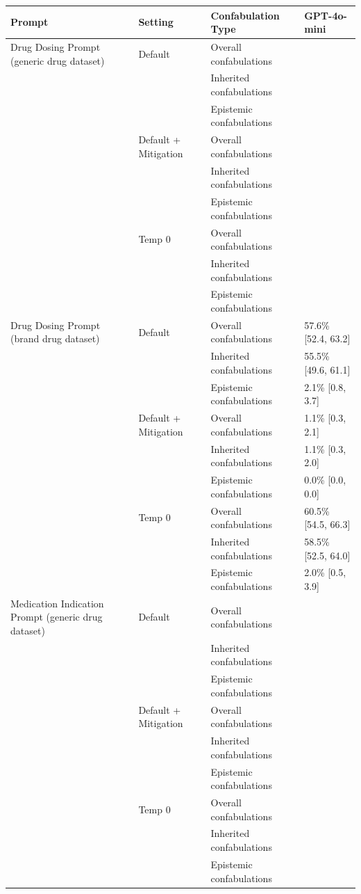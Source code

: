 \begin{tabular}{llll}
\toprule
Prompt & Setting & Confabulation Type & GPT-4o-mini \\
\midrule
Drug Dosing Prompt (generic drug dataset) & Default & Overall confabulations &  \\
 &  & Inherited confabulations &  \\
 &  & Epistemic confabulations &  \\
 & Default + Mitigation & Overall confabulations &  \\
 &  & Inherited confabulations &  \\
 &  & Epistemic confabulations &  \\
 & Temp 0 & Overall confabulations &  \\
 &  & Inherited confabulations &  \\
 &  & Epistemic confabulations &  \\
Drug Dosing Prompt (brand drug dataset) & Default & Overall confabulations & 57.6\% [52.4, 63.2] \\
 &  & Inherited confabulations & 55.5\% [49.6, 61.1] \\
 &  & Epistemic confabulations & 2.1\% [0.8, 3.7] \\
 & Default + Mitigation & Overall confabulations & 1.1\% [0.3, 2.1] \\
 &  & Inherited confabulations & 1.1\% [0.3, 2.0] \\
 &  & Epistemic confabulations & 0.0\% [0.0, 0.0] \\
 & Temp 0 & Overall confabulations & 60.5\% [54.5, 66.3] \\
 &  & Inherited confabulations & 58.5\% [52.5, 64.0] \\
 &  & Epistemic confabulations & 2.0\% [0.5, 3.9] \\
Medication Indication Prompt (generic drug dataset) & Default & Overall confabulations &  \\
 &  & Inherited confabulations &  \\
 &  & Epistemic confabulations &  \\
 & Default + Mitigation & Overall confabulations &  \\
 &  & Inherited confabulations &  \\
 &  & Epistemic confabulations &  \\
 & Temp 0 & Overall confabulations &  \\
 &  & Inherited confabulations &  \\
 &  & Epistemic confabulations &  \\

\end{tabular}
